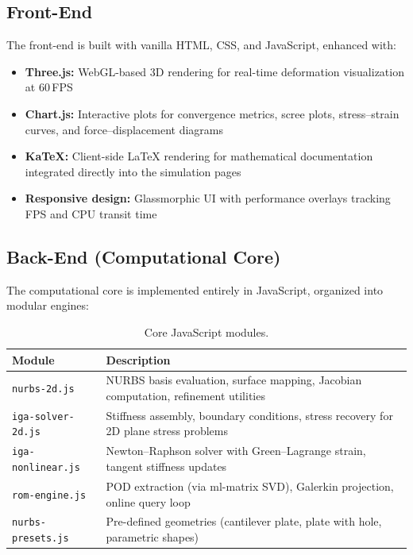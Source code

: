 \subsection{Front-End}

The front-end is built with vanilla HTML, CSS, and JavaScript, enhanced with:
\begin{itemize}
    \item \textbf{Three.js:} WebGL-based 3D rendering for real-time deformation visualization at 60\,FPS
    \item \textbf{Chart.js:} Interactive plots for convergence metrics, scree plots, stress--strain curves, and force--displacement diagrams
    \item \textbf{KaTeX:} Client-side \LaTeX{} rendering for mathematical documentation integrated directly into the simulation pages
    \item \textbf{Responsive design:} Glassmorphic UI with performance overlays tracking FPS and CPU transit time
\end{itemize}

\subsection{Back-End (Computational Core)}

The computational core is implemented entirely in JavaScript, organized into modular engines:

\begin{table}[H]
\centering
\caption{Core JavaScript modules.}
\label{tab:modules}
\begin{tabularx}{\textwidth}{lX}
\toprule
\textbf{Module} & \textbf{Description} \\
\midrule
\texttt{nurbs-2d.js} & NURBS basis evaluation, surface mapping, Jacobian computation, refinement utilities \\
\texttt{iga-solver-2d.js} & Stiffness assembly, boundary conditions, stress recovery for 2D plane stress problems \\
\texttt{iga-nonlinear.js} & Newton--Raphson solver with Green--Lagrange strain, tangent stiffness updates \\
\texttt{rom-engine.js} & POD extraction (via ml-matrix SVD), Galerkin projection, online query loop \\
\texttt{nurbs-presets.js} & Pre-defined geometries (cantilever plate, plate with hole, parametric shapes) \\
\bottomrule
\end{tabularx}
\end{table}

